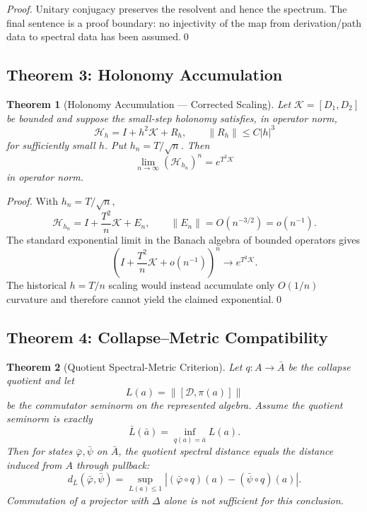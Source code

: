 \documentclass[12pt, oneside]{article}
\newtheorem{theorem}{Theorem}[section]
\begin{document}
\begin{proof}
Unitary conjugacy preserves the resolvent and hence the spectrum. The final sentence is a proof boundary: no injectivity of the map from derivation/path data to spectral data has been assumed.\qed
\end{proof}

\subsection{Theorem 3: Holonomy Accumulation}

\begin{theorem}[Holonomy Accumulation --- Corrected Scaling]
Let $\mathcal K=[D_1,D_2]$ be bounded and suppose the small-step holonomy satisfies, in operator norm,
\[
\mathcal H_h=I+h^2\mathcal K+R_h,
\qquad \|R_h\|\le C|h|^3
\]
for sufficiently small $h$. Put $h_n=T/\sqrt n$. Then
\[
\lim_{n\to\infty}(\mathcal H_{h_n})^n=e^{T^2\mathcal K}
\]
in operator norm.
\end{theorem}

\begin{proof}
With $h_n=T/\sqrt n$,
\[
\mathcal H_{h_n}=I+\frac{T^2}{n}\mathcal K+E_n,
\qquad \|E_n\|=O(n^{-3/2})=o(n^{-1}).
\]
The standard exponential limit in the Banach algebra of bounded operators gives
\[
\left(I+\frac{T^2}{n}\mathcal K+o(n^{-1})\right)^n\longrightarrow e^{T^2\mathcal K}.
\]
The historical $h=T/n$ scaling would instead accumulate only $O(1/n)$ curvature and therefore cannot yield the claimed exponential.\qed
\end{proof}

\subsection{Theorem 4: Collapse–Metric Compatibility}

\begin{theorem}[Quotient Spectral-Metric Criterion]
Let $q:A\to \bar A$ be the collapse quotient and let
\[
L(a)=\|[\mathcal D,\pi(a)]\|
\]
be the commutator seminorm on the represented algebra. Assume the quotient seminorm is exactly
\[
\bar L(\bar a)=\inf_{q(a)=\bar a}L(a).
\]
Then for states $\bar\varphi,\bar\psi$ on $\bar A$, the quotient spectral distance equals the distance induced from $A$ through pullback:
\[
d_{\bar L}(\bar\varphi,\bar\psi)
=
\sup_{L(a)\le 1}|(\bar\varphi\circ q)(a)-(\bar\psi\circ q)(a)|.
\]
Commutation of a projector with $\Delta$ alone is not sufficient for this conclusion.
\end{theorem}
\end{document}
